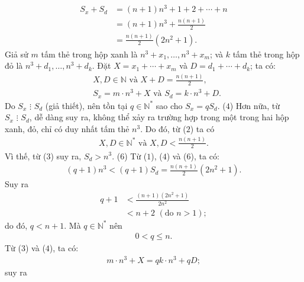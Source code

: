 \begin{multicols}{2}
\begin{align*}
		{S_x} + {S_d} &= \left( {n + 1} \right){n^3} + 1 + 2 +  \cdots  + n \\
		&= \left( {n + 1} \right){n^3} + \frac{{n\left( {n + 1} \right)}}{2} \\
		&= \frac{{n\left( {n + 1} \right)}}{2}\left( {2{n^2} + 1} \right). \tag{$1$}
	\end{align*}
	Giả sử $m$ tấm thẻ trong hộp xanh là \linebreak ${n^3} + {x_1}, \ldots ,  {n^3} + {x_m}$; và $k$ tấm thẻ trong hộp đỏ là   ${n^3} + {d_1},\ldots,{n^3} + {d_k}$.
	\vskip 0.05cm
	Đặt $X = {x_1} +  \cdots  + {x_m}$  và  $D = {d_1} +  \cdots  + {d_k}$; ta có:
	\begin{align*}
		&X, D \in \mathbb{N} \text{ và }  X + D = \frac{{n\left( {n + 1} \right)}}{2}, \tag{$2$}\\
		&{S_x} = m \cdot {n^3} + X \text{ và } {S_d} = k \cdot {n^3} + D. \tag{$3$}
	\end{align*}
	Do ${S_x} \,\,\vdots\,\, {S_d}$  (giả thiết), nên tồn tại $q \in \mathbb{N^*}$  sao cho ${S_x} = q{S_d}$. \hfill ($4$)
	\vskip 0.05cm                                                               
	Hơn nữa, từ ${S_x} \,\,\vdots\,\, {S_d}$, dễ dàng suy ra, không thể xảy ra trường hợp trong một trong hai hộp xanh, đỏ, chỉ có duy nhất tấm thẻ $n^3$.  Do đó, từ ($2$) ta có
	\begin{align*}
		X, D \in \mathbb{N^*} \text{ và } X,D < \frac{{n\left( {n + 1} \right)}}{2}. \tag{$5$}
	\end{align*}   
	Vì thế, từ ($3$) suy ra,   ${S_d} > {n^3}.$         \hfill ($6$)
	\vskip 0.05cm
	Từ ($1$), ($4$) và ($6$), ta có:
	\begin{align*}
		\left( {q \!+\! 1} \right){n^3} \!<\! \left( {q \!+\! 1} \right){S_d} \!=\! \frac{{n\left( {n \!+\! 1} \right)}}{2}\left( {2{n^2} \!+\! 1} \right).
	\end{align*}
	Suy ra
	\begin{align*}
		q + 1 &< \frac{{\left( {n + 1} \right)\left( {2{n^2} + 1} \right)}}{{2{n^2}}} \\
		&< n + 2 \,\,(\text{do } n >1);
	\end{align*}
	do đó, $q < n + 1$. Mà  $q \in \mathbb{N^*}$ nên 
	\begin{align*}
		0 < q \le n. \tag{$7$}
	\end{align*}
	Từ ($3$) và ($4$), ta có:
	\begin{align*}
		m \cdot {n^3} + X = qk \cdot {n^3} + qD;
	\end{align*}
	suy ra
	\begin{align*}

\end{align*}
\end{multicols}
